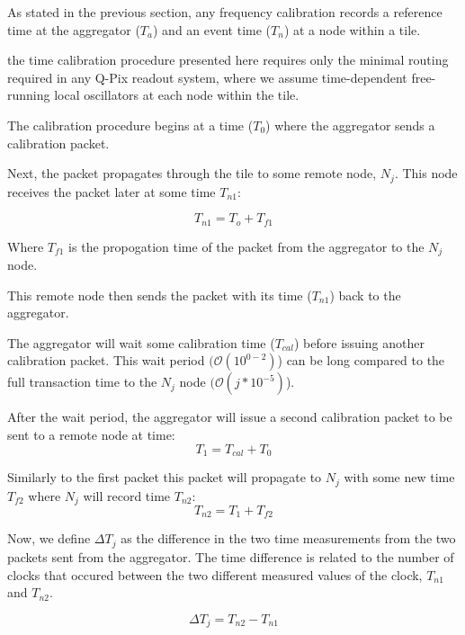 As stated in the previous section, any frequency calibration records a reference time at the aggregator ($T_{a}$) and an event time ($T_{n}$) at a node within a tile.

the time calibration procedure presented here requires only the minimal routing required in any Q-Pix readout system, where we assume time-dependent free-running local oscillators at each node within the tile.

The calibration procedure begins at a time ($T_{0}$) where the aggregator sends a calibration packet.

Next, the packet propagates through the tile to some remote node, $N_{j}$.
This node receives the packet later at some time $T_{n1}$:

\begin{equation}
  T_{n1} = T_{o} + T_{f1}
\end{equation}

Where $T_{f1}$ is the propogation time of the packet from the aggregator to the $N_{j}$ node.

This remote node then sends the packet with its time ($T_{n1}$) back to the aggregator.

The aggregator will wait some calibration time ($T_{cal}$) before issuing another calibration packet.
This wait period $(\mathcal{O}(10^{0-2})$) can be long compared to the full transaction time to the $N_{j}$ node $(\mathcal{O}(j*10^{-5})$).

After the wait period, the aggregator will issue a second calibration packet to be sent to a remote node at time:
\begin{equation}
  T_{1} = T_{cal} + T_{0}
\end{equation}

Similarly to the first packet this packet will propagate to $N_{j}$ with some new time $T_{f2}$ where $N_{j}$ will record time $T_{n2}$:
\begin{equation}
  T_{n2} = T_{1} + T_{f2}
\end{equation}

Now, we define $\Delta T_{j}$ as the difference in the two time measurements from the two packets sent from the aggregator.
The time difference is related to the number of clocks that occured between the two different measured values of the clock, $T_{n1}$ and $T_{n2}$.

\begin{equation}
  \Delta T_{j} = T_{n2} - T_{n1}
\end{equation}

